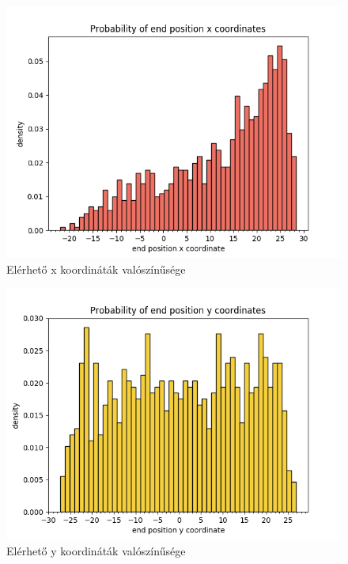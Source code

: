 \begin{figure}[h!]
\centering
\includegraphics[scale=0.75]{images/relative_x_endpos_density.png}
\caption{Elérhető x koordináták valószínűsége}
\label{fig:relative_x_endpos_density}
\end{figure}

\begin{figure}[h!]
\centering
\includegraphics[scale=0.75]{images/relative_y_endpos_density.png}
\caption{Elérhető y koordináták valószínűsége}
\label{fig:relative_y_endpos_density}
\end{figure}

\newpage


